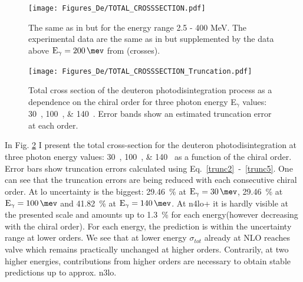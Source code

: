     
    \begin{figure}[htb!]
        \begin{center}
        \texttt{[image: Figures\_De/TOTAL\_CROSSSECTION.pdf]}
        \end{center}
        \caption{The same as in  but for the energy range 2.5 - 400 MeV.
        The experimental data are the same as in 
        but supplemented by the data above $\text{E}_\gamma=\SI{200}{\mev}$ from
        \cite{ARENDS1984} (crosses).
        }
        \label{TOTAL_CROSS}
    \end{figure}

    \begin{figure}[htb!]
        \begin{center}
            \texttt{[image: Figures\_De/TOTAL\_CROSSSECTION\_Truncation.pdf]}
        \end{center}
        \caption{Total cross section of the deuteron photodisintegration
        process as a dependence on the chiral order for three photon energy E$_\gamma$ values: \SIlist[list-units = single]{30;100;140}{\mev}.
        Error bands show an estimated truncation error at each order.}
        \label{Trunc_100}
    \end{figure}
    
    In Fig. \ref{Trunc_100} I present the total cross-section for the deuteron photodisintegration 
    at three photon energy values: \SIlist[list-units = single]{30;100;140}{\mev} as a function of the chiral order.
    Error bars show truncation errors calculated using Eq.~\ref{trunc2}~-~\ref{trunc5}.
    One can see that the truncation errors are being reduced with each consecutive chiral order. 
    At \gls{lo} uncertainty is the biggest: \SI{29.46}{\percent} at $\text{E}_\gamma = \SI{30}{\mev}$,
    \SI{29.46}{\percent} at $\text{E}_\gamma = \SI{100}{\mev}$ and
    \SI{41.82}{\percent} at $\text{E}_\gamma = \SI{140}{\mev}$.
    At \gls{n4lo+} it is hardly visible at the presented scale and amounts up to 
    \SI{1.3}{\percent} for each energy(however decreasing with the chiral order).
    For each energy, the prediction is within the uncertainty range at lower orders.
    We see that at lower energy $\sigma_{tot}$ already at NLO reaches valve which remains
    practically unchanged at higher orders.
    Contrarily, at two higher energies, contributions from higher orders are necessary to obtain 
    stable predictions up to approx. \gls{n3lo}.

